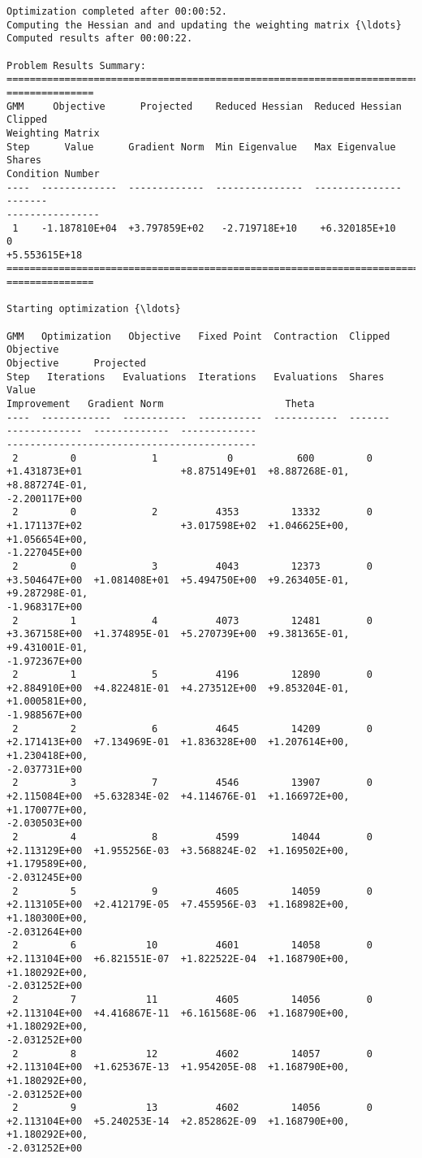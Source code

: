 \begin{Verbatim}[commandchars=\\\{\}]
Optimization completed after 00:00:52.
Computing the Hessian and and updating the weighting matrix {\ldots}
Computed results after 00:00:22.

Problem Results Summary:
================================================================================
===============
GMM     Objective      Projected    Reduced Hessian  Reduced Hessian  Clipped
Weighting Matrix
Step      Value      Gradient Norm  Min Eigenvalue   Max Eigenvalue   Shares
Condition Number
----  -------------  -------------  ---------------  ---------------  -------
----------------
 1    -1.187810E+04  +3.797859E+02   -2.719718E+10    +6.320185E+10      0
+5.553615E+18
================================================================================
===============

Starting optimization {\ldots}

GMM   Optimization   Objective   Fixed Point  Contraction  Clipped    Objective
Objective      Projected
Step   Iterations   Evaluations  Iterations   Evaluations  Shares       Value
Improvement   Gradient Norm                     Theta
----  ------------  -----------  -----------  -----------  -------
-------------  -------------  -------------
-------------------------------------------
 2         0             1            0           600         0
+1.431873E+01                 +8.875149E+01  +8.887268E-01, +8.887274E-01,
-2.200117E+00
 2         0             2          4353         13332        0
+1.171137E+02                 +3.017598E+02  +1.046625E+00, +1.056654E+00,
-1.227045E+00
 2         0             3          4043         12373        0
+3.504647E+00  +1.081408E+01  +5.494750E+00  +9.263405E-01, +9.287298E-01,
-1.968317E+00
 2         1             4          4073         12481        0
+3.367158E+00  +1.374895E-01  +5.270739E+00  +9.381365E-01, +9.431001E-01,
-1.972367E+00
 2         1             5          4196         12890        0
+2.884910E+00  +4.822481E-01  +4.273512E+00  +9.853204E-01, +1.000581E+00,
-1.988567E+00
 2         2             6          4645         14209        0
+2.171413E+00  +7.134969E-01  +1.836328E+00  +1.207614E+00, +1.230418E+00,
-2.037731E+00
 2         3             7          4546         13907        0
+2.115084E+00  +5.632834E-02  +4.114676E-01  +1.166972E+00, +1.170077E+00,
-2.030503E+00
 2         4             8          4599         14044        0
+2.113129E+00  +1.955256E-03  +3.568824E-02  +1.169502E+00, +1.179589E+00,
-2.031245E+00
 2         5             9          4605         14059        0
+2.113105E+00  +2.412179E-05  +7.455956E-03  +1.168982E+00, +1.180300E+00,
-2.031264E+00
 2         6            10          4601         14058        0
+2.113104E+00  +6.821551E-07  +1.822522E-04  +1.168790E+00, +1.180292E+00,
-2.031252E+00
 2         7            11          4605         14056        0
+2.113104E+00  +4.416867E-11  +6.161568E-06  +1.168790E+00, +1.180292E+00,
-2.031252E+00
 2         8            12          4602         14057        0
+2.113104E+00  +1.625367E-13  +1.954205E-08  +1.168790E+00, +1.180292E+00,
-2.031252E+00
 2         9            13          4602         14056        0
+2.113104E+00  +5.240253E-14  +2.852862E-09  +1.168790E+00, +1.180292E+00,
-2.031252E+00


\end{Verbatim}
